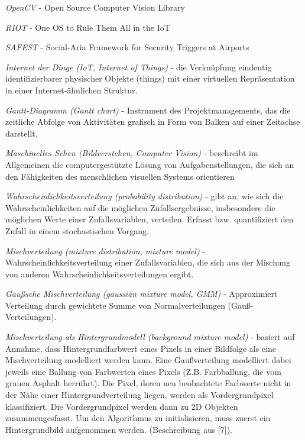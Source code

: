 \documentclass[10pt,a4paper]{article}
\begin{document}
\begin {description}

\item {\it OpenCV} - Open Source Computer Vision Library

\item {\it RIOT} - One OS to Rule Them All in the IoT

\item {\it SAFEST} - Social-Aria Framework for Security Triggers at Airports

\item {\it Internet der Dinge (IoT, Internet of Things)} - die Verknüpfung eindeutig identifizierbarer physischer Objekte (things) mit einer virtuellen Repräsentation in einer Internet-ähnlichen Struktur.

\item {\it Gantt-Diagramm (Gantt chart)} - Instrument des Projektmanagements, das die zeitliche Abfolge von Aktivitäten grafisch in Form von Balken auf einer Zeitachse darstellt. 

\item {\it Maschinelles Sehen (Bildverstehen, Computer Vision)} - beschreibt im Allgemeinen die computergestützte Lösung von Aufgabenstellungen, die sich an den Fähigkeiten des menschlichen visuellen Systems orientieren

\item {\it Wahrscheinlichkeitsverteilung (probability distribution)} - gibt an, wie sich die Wahrscheinlichkeiten auf die möglichen Zufallsergebnisse, insbesondere die möglichen Werte einer Zufallsvariablen, verteilen. Erfasst bzw. quantifiziert den Zufall in einem stochastischen Vorgang.

\item {\it Mischverteilung (mixture distribution, mixture model)} - Wahrscheinlichkeitsverteilung einer Zufallsvariablen, die sich aus der Mischung von anderen Wahrscheinlichkeitsverteilungen ergibt.

\item {\it Gaußsche Mischverteilung (gaussian mixture model, GMM)} - Approximiert Verteilung durch gewichtete Summe von Normalverteilungen (Gauß-Verteilungen).

\item {\it Mischverteilung als Hintergrundmodell (background mixture model)} - basiert auf Annahme, dass Hintergrundfarbwert eines Pixels in einer Bildfolge als eine Mischverteilung modelliert werden kann. Eine Gaußverteilung modelliert dabei jeweils eine Ballung von Farbwerten eines Pixels (Z.B. Farbballung, die vom grauen Asphalt herrührt). Die Pixel, deren neu beobachtete Farbwerte nicht in der Nähe einer Hintergrundverteilung liegen, werden als Vordergrundpixel klassifiziert. Die Vordergrundpixel werden dann zu 2D Objekten zusammengesfasst. Um den Algorithmus zu initialisieren, muss zuerst ein Hintergrundbild aufgenommen werden. (Beschreibung aus [7]).


\end{description}
\end{document}
